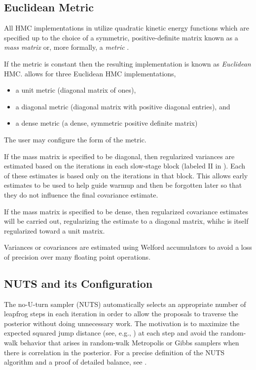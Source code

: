 \subsection{Euclidean Metric}

All HMC implementations in \Stan utilize quadratic kinetic energy
functions which are specified up to the choice of a symmetric,
positive-definite matrix known as a \textit{mass matrix} or, more
formally, a \textit{metric} \citep{Betancourt-Stein:2011}.

If the metric is constant then the resulting implementation is known
as \textit{Euclidean} HMC.  \Stan allows for three Euclidean HMC
implementations,
%
\begin{itemize}
\item a unit metric (diagonal matrix of ones),
\item a diagonal metric (diagonal matrix with positive diagonal
  entries), and
\item a dense metric (a dense, symmetric positive definite matrix)
\end{itemize}
%
The user may configure the form of the metric.

If the mass matrix is specified to be diagonal, then regularized
variances are estimated based on the iterations in each slow-stage
block (labeled II in ).  Each of these estimates
is based only on the iterations in that block.  This allows early
estimates to be used to help guide warmup and then be forgotten later 
so that they do not influence the final covariance estimate.

If the mass matrix is specified to be dense, then regularized
covariance estimates will be carried out, regularizing the estimate to 
a diagonal matrix, whihc is itself regularized toward a unit matrix.

Variances or covariances are estimated using Welford accumulators
to avoid a loss of precision over many floating point operations.


\subsection{NUTS and its Configuration}

The no-U-turn sampler (NUTS) automatically selects an appropriate
number of leapfrog steps in each iteration in order to allow the
proposals to traverse the posterior without doing unnecessary work.
The motivation is to maximize the expected squared jump distance (see,
e.g., \citep{RobertsEtAl:1997}) at each step and avoid the random-walk behavior
that arises in random-walk Metropolis or Gibbs samplers when there is
correlation in the posterior. For a precise definition of the NUTS
algorithm and a proof of detailed balance, see
\citep{Hoffman-Gelman:2011,
  Hoffman-Gelman:2014}.

